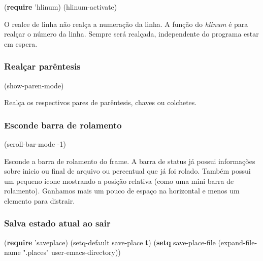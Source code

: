 \documentclass[]{article}
\newenvironment{Shaded}{}{}
\newcommand{\KeywordTok}[1]{\textcolor[rgb]{0.00,0.44,0.13}{\textbf{{#1}}}}
\newcommand{\DecValTok}[1]{\textcolor[rgb]{0.25,0.63,0.44}{{#1}}}
\newcommand{\StringTok}[1]{\textcolor[rgb]{0.25,0.44,0.63}{{#1}}}
\newcommand{\NormalTok}[1]{{#1}}
\begin{document}
\begin{Shaded}
\begin{Highlighting}[]
\NormalTok{(}\KeywordTok{require} \NormalTok{'hlinum)}
\NormalTok{(hlinum-activate)}
\end{Highlighting}
\end{Shaded}

O realce de linha não realça a numeração da linha. A função do
\emph{hlinum} é para realçar o número da linha. Sempre será realçada,
independente do programa estar em espera.

\subsubsection{Realçar parêntesis}\label{realuxe7ar-paruxeantesis}

\begin{Shaded}
\begin{Highlighting}[]
\NormalTok{(show-paren-mode)}
\end{Highlighting}
\end{Shaded}

Realça os respectivos pares de parêntesis, chaves ou colchetes.

\subsubsection{Esconde barra de
rolamento}\label{esconde-barra-de-rolamento}

\begin{Shaded}
\begin{Highlighting}[]
\NormalTok{(scroll-bar-mode -}\DecValTok{1}\NormalTok{)}
\end{Highlighting}
\end{Shaded}

Esconde a barra de rolamento do frame. A barra de status já possui
informações sobre inicio ou final de arquivo ou percentual que já foi
rolado. Também possui um pequeno ícone mostrando a posição relativa
(como uma mini barra de rolamento). Ganhamos mais um pouco de espaço na
horizontal e menos um elemento para distrair.

\subsubsection{Salva estado atual ao
sair}\label{salva-estado-atual-ao-sair}

\begin{Shaded}
\begin{Highlighting}[]
\NormalTok{(}\KeywordTok{require} \NormalTok{'saveplace)}
\NormalTok{(setq-default save-place }\KeywordTok{t}\NormalTok{)}
\NormalTok{(}\KeywordTok{setq} \NormalTok{save-place-file (expand-file-name}
  \StringTok{".places"} \NormalTok{user-emacs-directory))}
\end{Highlighting}
\end{Shaded}
\end{document}
